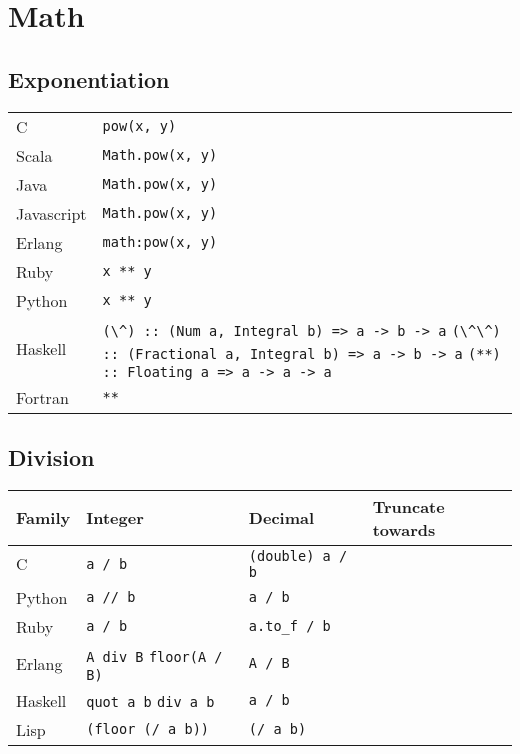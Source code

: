 \documentclass{article}
\begin{document}
\section{Math}
\subsection{Exponentiation}
\begin{longtabu} to 0.75\linewidth { X X }
	C & \lstinline$pow(x, y)$ \\
	Scala & \lstinline$Math.pow(x, y)$ \\
	Java & \lstinline$Math.pow(x, y)$ \\
	Javascript & \lstinline$Math.pow(x, y)$ \\
	Erlang & \lstinline$math:pow(x, y)$ \\
	Ruby & \lstinline$x ** y$ \\
	Python & \lstinline$x ** y$ \\
	Haskell & \lstinline$(\^) :: (Num a, Integral b) => a -> b -> a$ \newline \lstinline$(\^\^) :: (Fractional a, Integral b) => a -> b -> a$ \newline \lstinline$(**) :: Floating a => a -> a -> a$ \\
	Fortran & \lstinline$**$ \\
\end{longtabu}

\subsection{Division}
\begin{longtabu} to 0.75\linewidth { X X X X }
	Family & Integer & Decimal & Truncate towards \\
	\hline
	C & \lstinline$a / b$ & \lstinline$(double) a / b$ & \\
	Python & \lstinline$a // b$ & \lstinline$a / b$ & \\
	Ruby & \lstinline$a / b$ & \lstinline$a.to_f / b$ & \\
	Erlang & \lstinline$A div B$ \newline \lstinline$floor(A / B)$ & \lstinline$A / B$ & \\
	Haskell & \lstinline$quot a b$ \newline \lstinline$div a b$ & \lstinline$a / b$ & \\
	Lisp & \lstinline$(floor (/ a b))$ & \lstinline$(/ a b)$ & \\
\end{longtabu}
\end{document}
